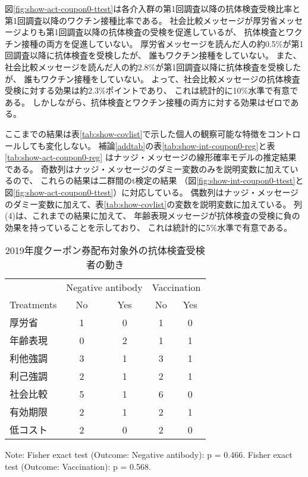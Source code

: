 \documentclass[
  11pt,
  a4paper,
]{article}
\begin{document}
図\ref{fig:show-act-coupon0-ttest}は各介入群の第1回調査以降の抗体検査受検比率と
第1回調査以降のワクチン接種比率である。
社会比較メッセージが厚労省メッセージよりも第1回調査以降の抗体検査の受検を促進しているが、
抗体検査とワクチン接種の両方を促進していない。
厚労省メッセージを読んだ人の約0.5\%が第1回調査以降に抗体検査を受検したが、
誰もワクチン接種をしていない。
また、社会比較メッセージを読んだ人の約2.8\%が第1回調査以降に抗体検査を受検したが、
誰もワクチン接種をしていない。
よって、社会比較メッセージの抗体検査受検に対する効果は約2.3\%ポイントであり、
これは統計的に10\%水準で有意である。
しかしながら、抗体検査とワクチン接種の両方に対する効果はゼロである。

ここまでの結果は表\ref{tab:show-covlist}で示した個人の観察可能な特徴をコントロールしても変化しない。
補論\ref{addtab}の表\ref{tab:show-int-coupon0-reg}と表\ref{tab:show-act-coupon0-reg}
はナッジ・メッセージの線形確率モデルの推定結果である。
奇数列はナッジ・メッセージのダミー変数のみを説明変数に加えているので、
これらの結果は二群間のt検定の結果
（図\ref{fig:show-int-coupon0-ttest}と図\ref{fig:show-act-coupon0-ttest}）に対応している。
偶数列はナッジ・メッセージのダミー変数に加えて、表\ref{tab:show-covlist}の変数を説明変数に加えている。
列(4)は、これまでの結果に加えて、
年齢表現メッセージが抗体検査の受検に負の効果を持っていることを示しており、
これは統計的に5\%水準で有意である。

\begin{table}

\caption{\label{tab:show-tester-coupon0}2019年度クーポン券配布対象外の抗体検査受検者の動き}
\centering
\begin{threeparttable}
\begin{tabular}[t]{lcccc}
\toprule
\multicolumn{1}{c}{ } & \multicolumn{2}{c}{Negative antibody} & \multicolumn{2}{c}{Vaccination} \\
\cmidrule(l{3pt}r{3pt}){2-3} \cmidrule(l{3pt}r{3pt}){4-5}
Treatments & No & Yes & No  & Yes \\
\midrule
厚労省 & 1 & 0 & 1 & 0\\
年齢表現 & 0 & 2 & 1 & 1\\
利他強調 & 3 & 1 & 3 & 1\\
利己強調 & 2 & 1 & 2 & 1\\
社会比較 & 5 & 1 & 6 & 0\\
有効期限 & 2 & 1 & 2 & 1\\
低コスト & 2 & 0 & 2 & 0\\
\bottomrule
\end{tabular}
\begin{tablenotes}
\item Note: Fisher exact test (Outcome: Negative antibody): p = 0.466. Fisher exact test (Outcome: Vaccination): p = 0.568.
\end{tablenotes}
\end{threeparttable}
\end{table}
\end{document}

